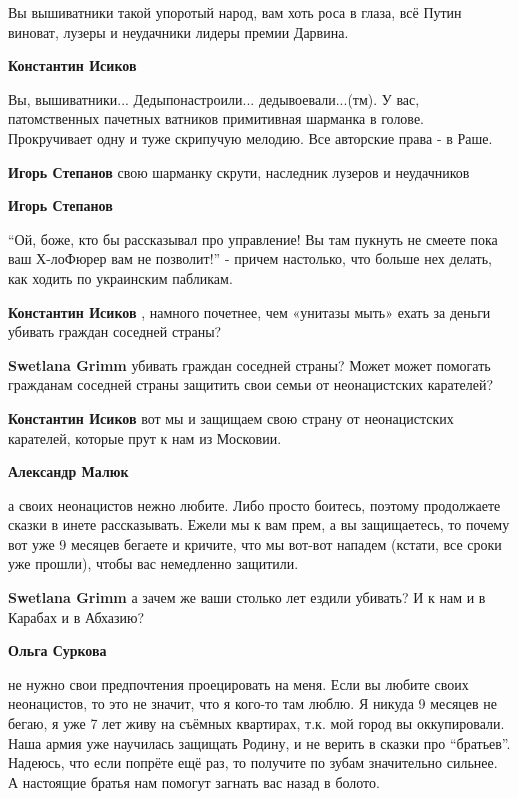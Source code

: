 \begin{itemize}
\begin{itemize}
Вы вышиватники такой упоротый народ, вам хоть роса в глаза, всё Путин виноват,
лузеры и неудачники лидеры премии Дарвина.


\textbf{Константин Исиков} 

Вы, вышиватники... Дедыпонастроили... дедывоевали...(тм). У вас, патомственных
пачетных ватников примитивная шарманка в голове. Прокручивает одну и туже
скрипучую мелодию. Все авторские права - в Раше.


\textbf{Игорь Степанов} свою шарманку скрути, наследник лузеров и неудачников

\textbf{Игорь Степанов} 

\enquote{Ой, боже, кто бы рассказывал про управление! Вы там пукнуть не смеете пока ваш
Х-лоФюрер вам не позволит!} - причем настолько, что больше нех делать, как
ходить по украинским пабликам.


\textbf{Константин Исиков} , намного почетнее, чем «унитазы мыть» ехать за деньги убивать граждан соседней страны?

\textbf{Swetlana Grimm} убивать граждан соседней страны?
Может может помогать гражданам соседней страны защитить свои семьи от неонацистских карателей?

\textbf{Константин Исиков} вот мы и защищаем свою страну от неонацистских карателей, которые прут к нам из Московии.

\textbf{Александр Малюк}

а своих неонацистов нежно любите. Либо просто боитесь, поэтому продолжаете
сказки в инете рассказывать. Ежели мы к вам прем, а вы защищаетесь, то почему
вот уже 9 месяцев бегаете и кричите, что мы вот-вот нападем (кстати, все сроки
уже прошли), чтобы вас немедленно защитили.

\textbf{Swetlana Grimm} а зачем же ваши столько лет ездили убивать? И к нам и в Карабах и в Абхазию?

\textbf{Ольга Суркова} 

не нужно свои предпочтения проецировать на меня. Если вы любите своих
неонацистов, то это не значит, что я кого-то там люблю. Я никуда 9 месяцев не
бегаю, я уже 7 лет живу на съёмных квартирах, т.к. мой город вы оккупировали.
Наша армия уже научилась защищать Родину, и не верить в сказки про
\enquote{братьев}.  Надеюсь, что если попрёте ещё раз, то получите по зубам
значительно сильнее. А настоящие братья нам помогут загнать вас назад в болото.


\end{itemize}
\end{itemize}

